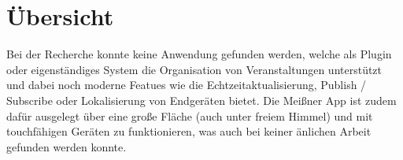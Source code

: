 
\section{Übersicht}
Bei der Recherche konnte keine Anwendung gefunden werden, welche als Plugin oder eigenständiges System die Organisation von Veranstaltungen unterstützt und dabei noch moderne Featues wie die Echtzeitaktualisierung, Publish / Subscribe oder Lokalisierung von Endgeräten bietet. Die Meißner App ist zudem dafür ausgelegt über eine große Fläche (auch unter freiem Himmel) und mit touchfähigen Geräten zu funktionieren, was auch bei keiner änlichen Arbeit gefunden werden konnte.